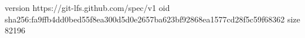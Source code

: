 version https://git-lfs.github.com/spec/v1
oid sha256:fa9ffb4dd0bed55f8ea300d5d0e2657ba623bf92868ea1577cd28f5c59f68362
size 82196
